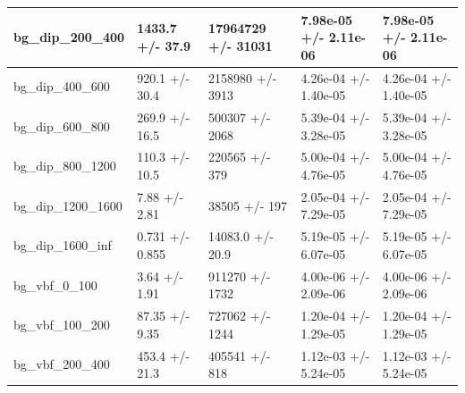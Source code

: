 \documentclass[a4paper, 10pt]{article}
\begin{document}
\begin{table}[H]
\begin{center}
\begin{tabular}{|m{20.0mm}|m{27.0mm}|m{27.0mm}|m{33.0mm}|m{32.0mm}|}
      \hline
      {\cellcolor{white}         bg\_dip\_200\_400}& {\cellcolor{white}         1433.7 +/\-- 37.9}& {\cellcolor{white}         17964729 +/\-- 31031}& {\cellcolor{white}         7.98e-05 +/\-- 2.11e-06}& {\cellcolor{white}         7.98e-05 +/\-- 2.11e-06}\\
      \hline
      {\cellcolor{white}         bg\_dip\_400\_600}& {\cellcolor{white}         920.1 +/\-- 30.4}& {\cellcolor{white}         2158980 +/\-- 3913}& {\cellcolor{white}         4.26e-04 +/\-- 1.40e-05}& {\cellcolor{white}         4.26e-04 +/\-- 1.40e-05}\\
      \hline
      {\cellcolor{white}         bg\_dip\_600\_800}& {\cellcolor{white}         269.9 +/\-- 16.5}& {\cellcolor{white}         500307 +/\-- 2068}& {\cellcolor{white}         5.39e-04 +/\-- 3.28e-05}& {\cellcolor{white}         5.39e-04 +/\-- 3.28e-05}\\
      \hline
      {\cellcolor{white}         bg\_dip\_800\_1200}& {\cellcolor{white}         110.3 +/\-- 10.5}& {\cellcolor{white}         220565 +/\-- 379}& {\cellcolor{white}         5.00e-04 +/\-- 4.76e-05}& {\cellcolor{white}         5.00e-04 +/\-- 4.76e-05}\\
      \hline
      {\cellcolor{white}         bg\_dip\_1200\_1600}& {\cellcolor{white}         7.88 +/\-- 2.81}& {\cellcolor{white}         38505 +/\-- 197}& {\cellcolor{white}         2.05e-04 +/\-- 7.29e-05}& {\cellcolor{white}         2.05e-04 +/\-- 7.29e-05}\\
      \hline
      {\cellcolor{white}         bg\_dip\_1600\_inf}& {\cellcolor{white}         0.731 +/\-- 0.855}& {\cellcolor{white}         14083.0 +/\-- 20.9}& {\cellcolor{white}         5.19e-05 +/\-- 6.07e-05}& {\cellcolor{white}         5.19e-05 +/\-- 6.07e-05}\\
      \hline
      {\cellcolor{white}         bg\_vbf\_0\_100}& {\cellcolor{white}         3.64 +/\-- 1.91}& {\cellcolor{white}         911270 +/\-- 1732}& {\cellcolor{white}         4.00e-06 +/\-- 2.09e-06}& {\cellcolor{white}         4.00e-06 +/\-- 2.09e-06}\\
      \hline
      {\cellcolor{white}         bg\_vbf\_100\_200}& {\cellcolor{white}         87.35 +/\-- 9.35}& {\cellcolor{white}         727062 +/\-- 1244}& {\cellcolor{white}         1.20e-04 +/\-- 1.29e-05}& {\cellcolor{white}         1.20e-04 +/\-- 1.29e-05}\\
      \hline
      {\cellcolor{white}         bg\_vbf\_200\_400}& {\cellcolor{white}         453.4 +/\-- 21.3}& {\cellcolor{white}         405541 +/\-- 818}& {\cellcolor{white}         1.12e-03 +/\-- 5.24e-05}& {\cellcolor{white}         1.12e-03 +/\-- 5.24e-05}\\

\end{tabular}
\end{center}
\end{table}
\end{document}
